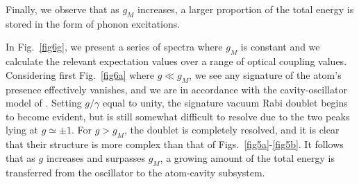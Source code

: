 \noindent Finally, we observe that as $g_M$ increases, a larger proportion of the total energy is stored in the form of phonon excitations.

In Fig.~\ref{fig6g}, we present a series of spectra where $g_M$ is constant and we calculate the relevant expectation values over a range of optical coupling values. Considering first Fig.~\ref{fig6a} where $g \ll g_M$, we see any signature of the atom's presence effectively vanishes, and we are in accordance with the cavity-oscillator model of \cite{girvin2011}. Setting $g/\gamma$ equal to unity, the signature vacuum Rabi doublet begins to become evident, but is still somewhat difficult to resolve due to the two peaks lying at $g \simeq \pm 1$. For $g > g_M$, the doublet is completely resolved, and it is clear that their structure is more complex than that of Figs.~\ref{fig5a}-\ref{fig5b}. It follows that as $g$ increases and surpasses $g_M$, a growing amount of the total energy is transferred from the oscillator to the atom-cavity subsystem.

